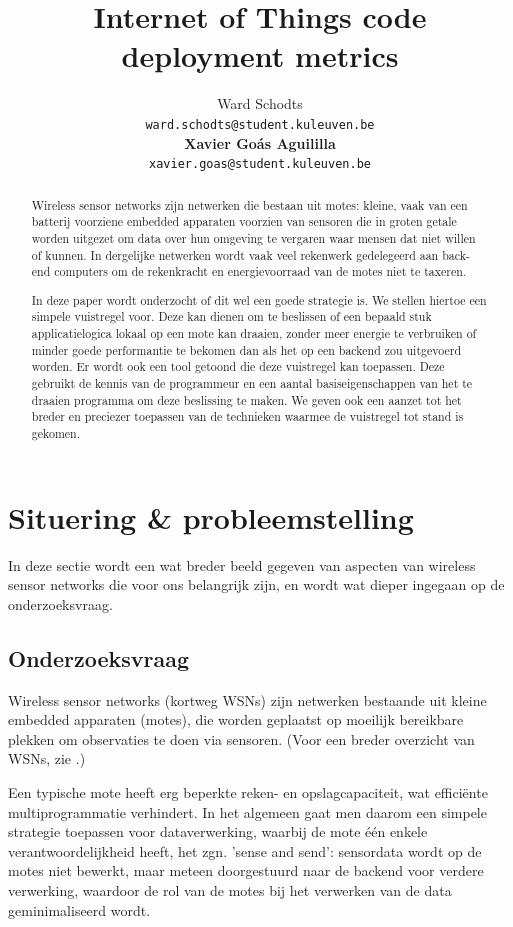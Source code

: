 \documentclass[11pt]{article}
\title{Internet of Things code deployment metrics}
\author{
  Ward Schodts\\
  \texttt{ward.schodts@student.kuleuven.be}
  \\[3ex]
  \textbf{Xavier Go\'as Aguililla}\\
  \texttt{xavier.goas@student.kuleuven.be}
}
\begin{document}
\maketitle

\listoftodos
\linespread{1.3}
\begin{abstract}
Wireless sensor networks zijn netwerken die bestaan uit motes: kleine, vaak van
een batterij voorziene embedded apparaten voorzien van sensoren die in groten
getale worden uitgezet om data over hun omgeving te vergaren waar mensen dat
niet willen of kunnen. In dergelijke netwerken wordt vaak veel rekenwerk
gedelegeerd aan back-end computers om de rekenkracht en energievoorraad van de
motes niet te taxeren. 

In deze paper wordt onderzocht of dit wel een goede strategie is. We stellen
hiertoe een simpele vuistregel voor. Deze kan dienen om te beslissen of een
bepaald stuk applicatielogica lokaal op een mote kan draaien, zonder meer
energie te verbruiken of minder goede performantie te bekomen dan als het op een
backend zou uitgevoerd worden. Er wordt ook een tool getoond die deze vuistregel
kan toepassen. Deze gebruikt de kennis van de programmeur en een aantal
basiseigenschappen van het te draaien programma om deze beslissing te maken. We
geven ook een aanzet tot het breder en preciezer toepassen van de technieken
waarmee de vuistregel tot stand is gekomen.
  
\end{abstract}

\section{Situering \& probleemstelling}

In deze sectie wordt een wat breder beeld gegeven van aspecten van wireless
sensor networks die voor ons belangrijk zijn, en wordt wat dieper ingegaan op de
onderzoeksvraag.

\subsection{Onderzoeksvraag}

Wireless sensor networks (kortweg WSNs) zijn netwerken bestaande uit kleine
embedded apparaten (motes), die worden geplaatst op moeilijk bereikbare plekken
om observaties te doen via sensoren. (Voor een breder overzicht van
WSNs, zie \cite{akyildiz2002wireless}.)

Een typische mote heeft erg beperkte reken- en opslagcapaciteit, wat
effici\"ente multiprogrammatie verhindert. In het algemeen gaat men daarom een
simpele strategie toepassen voor dataverwerking, waarbij de mote \'e\'en enkele
verantwoordelijkheid heeft, het zgn. 'sense and send': sensordata wordt op de
motes niet bewerkt, maar meteen doorgestuurd naar de backend voor verdere
verwerking, waardoor de rol van de motes bij het verwerken van de data
geminimaliseerd wordt.
\end{document}
